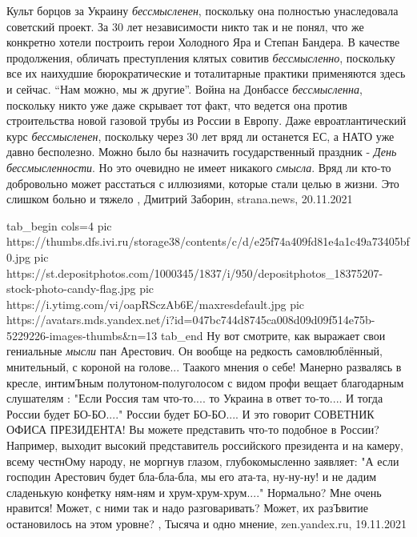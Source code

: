 Культ борцов за Украину \emph{бессмысленен}, поскольку она полностью унаследовала
советский проект. За 30 лет независимости никто так и не понял, что же
конкретно хотели построить герои Холодного Яра и Степан Бандера.  В качестве
продолжения, обличать преступления клятых совитив \emph{бессмысленно}, поскольку все
их наихудшие бюрократические и тоталитарные практики применяются здесь и
сейчас. \enquote{Нам можно, мы ж другие}.  Война на Донбассе \emph{бессмысленна}, поскольку
никто уже даже скрывает тот факт, что ведется она против строительства новой
газовой трубы из России в Европу.  Даже евроатлантический курс \emph{бессмысленен},
поскольку через 30 лет вряд ли останется ЕС, а НАТО уже давно бесполезно.
Можно было бы назначить государственный праздник - \emph{День бессмысленности}. Но это
очевидно не имеет никакого \emph{смысла}. Вряд ли кто-то добровольно может расстаться
с иллюзиями, которые стали целью в жизни. Это слишком больно и тяжело
, 
Дмитрий Заборин, strana.news, 20.11.2021

\ifcmt
  tab_begin cols=4
     pic https://thumbs.dfs.ivi.ru/storage38/contents/c/d/e25f74a409fd81e4a1c49a73405bf0.jpg
     pic https://st.depositphotos.com/1000345/1837/i/950/depositphotos_18375207-stock-photo-candy-flag.jpg
		 pic https://i.ytimg.com/vi/oapRSczAb6E/maxresdefault.jpg
		 pic https://avatars.mds.yandex.net/i?id=047bc744d8745ca008d09d09f514e75b-5229226-images-thumbs&n=13
  tab_end
\fi
Ну вот смотрите, как выражает свои гениальные \emph{мысли} пан Арестович.  Он
вообще на редкость самовлюблённый, мнительный, с короной на голове...  Таакого
мнения о себе!  Манерно развалясь в кресле, интимЪным полутоном-полуголосом с
видом профи вещает благодарным слушателям : "Если Россия там что-то.... то
Украина в ответ то-то.... И тогда России будет БО-БО...." России будет
БО-БО.... И это говорит СОВЕТНИК ОФИСА ПРЕЗИДЕНТА!  Вы можете представить
что-то подобное в России? Например, выходит высокий представитель российского
президента и на камеру, всему честнОму народу, не моргнув глазом,
глубокомысленно заявляет: "А если господин Арестович будет бла-бла-бла, мы его
ата-та, ну-ну-ну! и не дадим сладенькую конфетку ням-ням и хрум-хрум-хрум...."
Нормально? Мне очень нравится! Может, с ними так и надо разговаривать? Может,
их разЪвитие остановилось на этом уровне?
, 
Тысяча и одно мнение, zen.yandex.ru, 19.11.2021 

